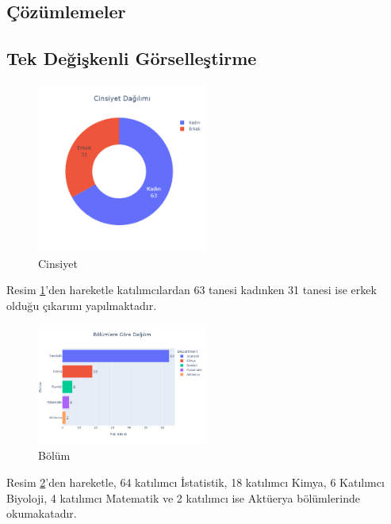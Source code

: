 \documentclass{article}
\begin{document}
\clearpage

\begin{twocolumn}
\section{Çözümlemeler}
\subsection{Tek Değişkenli Görselleştirme}

    \begin{figure}[htbp]
        \centering
        \includegraphics[width=0.5\textwidth]{Imgs/soru1.png}
        \caption{Cinsiyet}
        \label{soru1}
    \end{figure}    
Resim \ref{soru1}'den hareketle katılımcılardan 63 tanesi kadınken 31 tanesi ise erkek olduğu çıkarımı yapılmaktadır.

    \begin{figure}[htbp]
        \centering
        \includegraphics[width=0.5\textwidth]{Imgs/soru2-2.png}
        \caption{Bölüm}
        \label{soru2}
    \end{figure}
Resim \ref{soru2}'den hareketle, 64 katılımcı İstatistik, 18 katılımcı Kimya, 6 Katılımcı Biyoloji, 4 katılımcı Matematik ve 2 katılımcı ise Aktüerya bölümlerinde okumakatadır.


\end{twocolumn}
\end{document}
